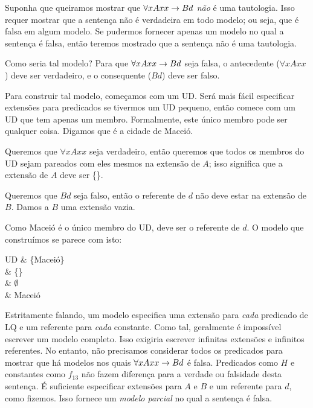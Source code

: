 Suponha que queiramos mostrar que $\forall xAxx \rightarrow Bd$ \emph{não} é uma tautologia. Isso requer mostrar que a sentença não é verdadeira em todo modelo; ou seja, que é falsa em algum modelo. Se pudermos fornecer apenas um modelo no qual a sentença é falsa, então teremos mostrado que a sentença não é uma tautologia.

Como seria tal modelo? Para que $\forall xAxx \rightarrow Bd$ seja falsa, o antecedente ($\forall x Axx$) deve ser verdadeiro, e o consequente ($Bd$) deve ser falso.

Para construir tal modelo, começamos com um UD. Será mais fácil especificar extensões para predicados se tivermos um UD pequeno, então comece com um UD que tem apenas um membro. Formalmente, este único membro pode ser qualquer coisa. Digamos que é a cidade de Maceió.

Queremos que $\forall x Axx$ seja verdadeiro, então queremos que todos os membros do UD sejam pareados com eles mesmos na extensão de $A$; isso significa que a extensão de $A$ deve ser \{\}.

Queremos que $Bd$ seja falso, então o referente de $d$ não deve estar na extensão de $B$. Damos a $B$ uma extensão vazia.

Como Maceió é o único membro do UD, deve ser o referente de $d$. O modelo que construímos se parece com isto:
\begin{partialmodel}
	UD			& \{Maceió\}\\
	 	& \{\}\\
		& $\emptyset$\\
		& Maceió
\end{partialmodel}

Estritamente falando, um modelo especifica uma extensão para \emph{cada} predicado de LQ e um referente para \emph{cada} constante. Como tal, geralmente é impossível escrever um modelo completo. Isso exigiria escrever infinitas extensões e infinitos referentes. No entanto, não precisamos considerar todos os predicados para mostrar que há modelos nos quais $\forall xAxx \rightarrow Bd$ é falsa. Predicados como $H$ e constantes como $f_{13}$ não fazem diferença para a verdade ou falsidade desta sentença. É suficiente especificar extensões para $A$ e $B$ e um referente para $d$, como fizemos. Isso fornece um \emph{modelo parcial} no qual a sentença é falsa.

